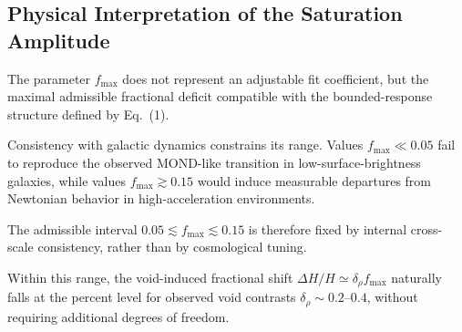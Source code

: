 \subsection{Physical Interpretation of the Saturation Amplitude}
  \label{subsec:physical-interpretation-of-the-saturation-amplitude}

  The parameter $f_{\max}$ does not represent an adjustable fit coefficient,
  but the maximal admissible fractional deficit compatible with the bounded-response
  structure defined by Eq.~(1).

  Consistency with galactic dynamics constrains its range.
  Values $f_{\max} \ll 0.05$ fail to reproduce the observed MOND-like
  transition in low-surface-brightness galaxies,
  while values $f_{\max} \gtrsim 0.15$ would induce measurable
  departures from Newtonian behavior in high-acceleration environments.

  The admissible interval $0.05 \lesssim f_{\max} \lesssim 0.15$
  is therefore fixed by internal cross-scale consistency,
  rather than by cosmological tuning.

  Within this range, the void-induced fractional shift
  $\Delta H/H \simeq \delta_\rho f_{\max}$
  naturally falls at the percent level for observed
  void contrasts $\delta_\rho \sim 0.2$--$0.4$,
  without requiring additional degrees of freedom.

